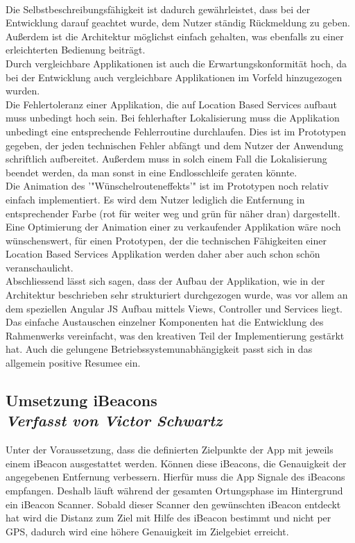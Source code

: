 \\
Die Selbstbeschreibungsfähigkeit ist dadurch gewährleistet, dass bei der Entwicklung darauf geachtet wurde, dem Nutzer ständig Rückmeldung zu geben. Außerdem ist die Architektur möglichst einfach gehalten, was ebenfalls zu einer erleichterten Bedienung beiträgt.
\\
Durch vergleichbare Applikationen ist auch die Erwartungskonformität hoch, da bei der Entwicklung auch vergleichbare Applikationen im Vorfeld hinzugezogen wurden.
\\
Die Fehlertoleranz einer Applikation, die auf Location Based Services aufbaut muss unbedingt hoch sein. Bei fehlerhafter Lokalisierung muss die Applikation unbedingt eine entsprechende Fehlerroutine durchlaufen. Dies ist im Prototypen gegeben, der jeden technischen Fehler abfängt und dem Nutzer der Anwendung schriftlich aufbereitet. Außerdem muss in solch einem Fall die Lokalisierung beendet werden, da man sonst in eine Endlosschleife geraten könnte.
\\
Die Animation des '"Wünschelrouteneffekts'" ist im Prototypen noch relativ einfach implementiert. Es wird dem Nutzer lediglich die Entfernung in entsprechender Farbe (rot für weiter weg und grün für näher dran) dargestellt. Eine Optimierung der Animation einer zu verkaufender Applikation wäre noch wünschenswert, für einen Prototypen, der die technischen Fähigkeiten einer Location Based Services Applikation werden daher aber auch schon schön veranschaulicht.
\\
Abschliessend lässt sich sagen, dass der Aufbau der Applikation, wie in der Architektur beschrieben sehr strukturiert durchgezogen wurde, was vor allem an dem speziellen Angular JS Aufbau mittels Views, Controller und Services liegt. Das einfache Austauschen einzelner Komponenten hat die Entwicklung des Rahmenwerks vereinfacht, was den kreativen Teil der Implementierung gestärkt hat. Auch die gelungene Betriebssystemunabhängigkeit passt sich in das allgemein positive Resumee ein.
\subsection[Umsetzung iBeacons]{Umsetzung iBeacons
 \\ \textnormal{\small{\textit {Verfasst von Victor Schwartz}}}}

Unter der Voraussetzung, dass die definierten Zielpunkte der App mit jeweils einem iBeacon ausgestattet werden. Können diese iBeacons, die Genauigkeit der angegebenen Entfernung verbessern.
Hierfür muss die App Signale des iBeacons empfangen. Deshalb läuft während der gesamten Ortungsphase im Hintergrund ein iBeacon Scanner. Sobald dieser Scanner den gewünschten iBeacon entdeckt hat wird die Distanz zum Ziel mit Hilfe des iBeacon bestimmt und nicht per GPS, dadurch wird eine höhere Genauigkeit im Zielgebiet erreicht.

